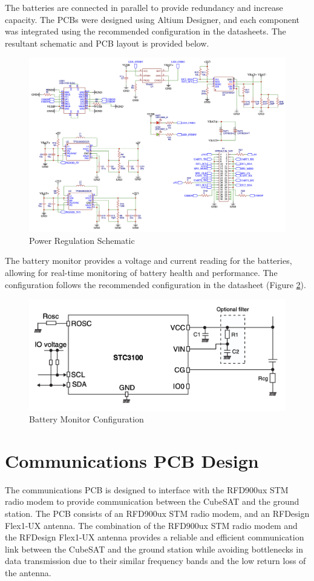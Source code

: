 \documentclass{report}
\begin{document}
            The batteries are connected in parallel to provide redundancy and increase capacity. The PCBs were designed using Altium Designer,
            and each component was integrated using the recommended configuration in the datasheets. 
            The resultant schematic and PCB layout is provided below.
            \begin{figure}[H]
                \centering
                \includegraphics[width=0.6\linewidth]{figures/PWR_SCHM.png}
                \caption{Power Regulation Schematic}
                \label{fig:power}
            \end{figure}
            The battery monitor provides a voltage and current reading for the batteries, allowing for
            real-time monitoring of battery health and performance. The configuration follows the recommended
            configuration in the datasheet \cite{STC3100} (Figure \ref{fig:battery_monitor}).
            \begin{figure}[H]
                \centering
                \includegraphics[width=0.6\linewidth]{figures/PWR_BM.png}
                \caption{Battery Monitor Configuration}
                \label{fig:battery_monitor}
            \end{figure}
        \section{Communications PCB Design}
            The communications PCB is designed to interface with the RFD900ux STM radio modem to provide communication
            between the CubeSAT and the ground station. The PCB consists of an RFD900ux STM radio modem, and
            an RFDesign Flex1-UX antenna. The combination of the RFD900ux STM radio modem and the RFDesign Flex1-UX antenna
            provides a reliable and efficient communication link between the CubeSAT and the ground station while 
            avoiding bottlenecks in data transmission due to their similar frequency bands and the low return loss of the antenna.
\end{document}
